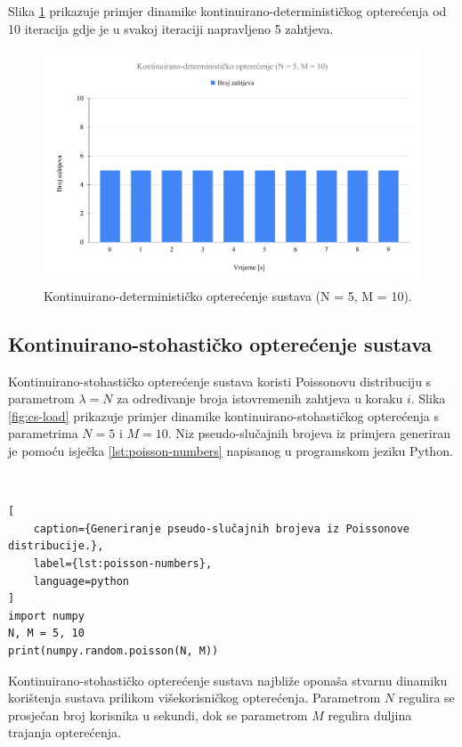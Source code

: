 \documentclass[times, utf8, diplomski]{fer}
\begin{document}
Slika \ref{fig:cd-load} prikazuje primjer dinamike kontinuirano-determinističkog opterećenja od 10 iteracija gdje je u svakoj iteraciji napravljeno 5 zahtjeva.

\begin{figure}[htb]
	\centering
	\includegraphics[width=\textwidth]{images/Kontinuirano-determinističko opterećenje (N = 5, M = 10).pdf}
	\caption{
		Kontinuirano-determinističko opterećenje sustava (N = 5, M = 10).
	}
	\label{fig:cd-load}
\end{figure}

\pagebreak

\subsection{Kontinuirano-stohastičko opterećenje sustava}
Kontinuirano-stohastičko opterećenje sustava koristi Poissonovu distribuciju s parametrom $\lambda = N$ za određivanje broja istovremenih zahtjeva u koraku $i$. Slika \ref{fig:cs-load} prikazuje primjer dinamike kontinuirano-stohastičkog opterećenja s parametrima $N=5$ i $M=10$. Niz pseudo-slučajnih brojeva iz primjera generiran je pomoću isječka \ref{lst:poisson-numbers} napisanog u programskom jeziku Python.

\

\begin{lstlisting}[
    caption={Generiranje pseudo-slučajnih brojeva iz Poissonove distribucije.},
    label={lst:poisson-numbers},
    language=python
]
import numpy
N, M = 5, 10
print(numpy.random.poisson(N, M))
\end{lstlisting}

Kontinuirano-stohastičko opterećenje sustava najbliže oponaša stvarnu dinamiku korištenja sustava prilikom višekorisničkog opterećenja. Parametrom $N$ regulira se prosječan broj korisnika u sekundi, dok se parametrom $M$ regulira duljina trajanja opterećenja.
\end{document}
